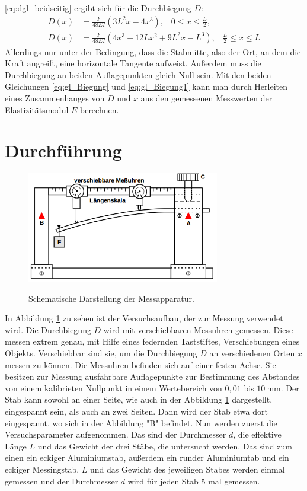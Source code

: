 \documentclass[
  bibliography=totoc,     %
  captions=tableheading,  %
  titlepage=firstiscover, %
]{scrartcl}
\begin{document}
\eqref{eq:dgl_beidseitig} ergibt sich für die Durchbiegung $D$:
\begin{align}
	D(x)&=\frac{F}{48EI}(3L^2x-4x^3), \;\;\; 0\leqslant  x\leqslant\frac{L}{2}\text{,}
    \label{eq:gl_Biegung1} \\
	D(x)&=\frac{F}{48EI}(4x^3-12Lx^2+9L^2x-L^3), \;\;\; \frac{L}{2}\leqslant  x\leqslant L
	\label{eq:gl_Biegung}
\end{align}
Allerdings nur unter der Bedingung, dass die Stabmitte, also der Ort, an dem die
Kraft angreift, eine horizontale Tangente aufweist. Außerdem muss die Durchbiegung
an beiden Auflagepunkten gleich Null sein. Mit den beiden Gleichungen
\eqref{eq:gl_Biegung} und \eqref{eq:gl_Biegung1} kann man durch Herleiten eines
Zusammenhanges von $D$ und $x$ aus den gemessenen Messwerten der
Elastizitätsmodul $E$ berechnen.
\newpage
\section{Durchführung}
\label{sec:durchführung}
\begin{figure}[H]
    \centering
    \caption{Schematische Darstellung der Messapparatur. \cite{anleitung}}
    \includegraphics[width=0.75\textwidth]{V1033.png}
    \label{fig:1033}
\end{figure}
In Abbildung \ref{fig:1033} zu sehen ist der Versuchsaufbau, der zur Messung
verwendet wird. Die Durchbiegung $D$ wird mit verschiebbaren Messuhren gemessen.
Diese messen extrem genau, mit Hilfe eines federnden Taststiftes, Verschiebungen
eines Objekts. Verschiebbar sind sie, um die Durchbiegung $D$ an verschiedenen
Orten $x$ messen zu können. Die Messuhren befinden sich auf einer festen Achse.
Sie besitzen zur Messung ausfahrbare Auflagepunkte zur Bestimmung des Abstandes
von einem kalibrieten Nullpunkt in einem Wertebereich von $0,01$ bis $\SI{10}{\milli\meter}$.
Der Stab kann sowohl an einer Seite, wie auch in der Abbildung \ref{fig:1033}
dargestellt, eingespannt sein, als auch an zwei Seiten. Dann wird der Stab etwa
dort eingespannt, wo sich in der Abbildung "B" befindet.
Nun werden zuerst die Versuchsparameter aufgenommen. Das sind der Durchmesser
$d$, die effektive Länge $L$ und das Gewicht der drei Stäbe, die untersucht
werden. Das sind zum einen ein eckiger Aluminiumstab, außerdem ein runder
Aluminiumtab und ein eckiger Messingstab. $L$ und das Gewicht des jeweiligen
Stabes werden einmal gemessen und der Durchmesser $d$ wird für jeden Stab 5 mal
gemessen.
\end{document}
